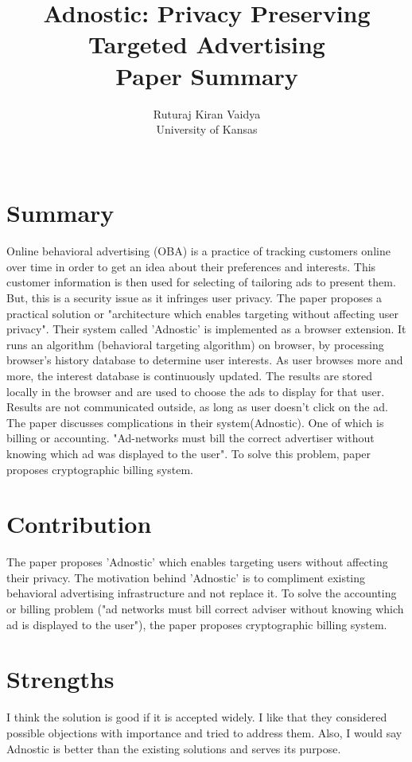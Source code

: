 \documentclass{article}
\title{Adnostic: Privacy Preserving Targeted Advertising \large \\Paper Summary}
\author{Ruturaj Kiran Vaidya\\
  \small University of Kansas\\\\
}
\date{\vspace{-5ex}}
\begin{document}
\maketitle

\section{Summary}
Online behavioral advertising (OBA) is a practice of tracking customers online over time in order to get an idea about their preferences and interests. This customer information is then used for selecting of tailoring ads to present them. But, this is a security issue as it infringes user privacy. The paper proposes a practical solution or "architecture which enables targeting without affecting user privacy"\cite{Cd94}. Their system called 'Adnostic' is implemented as a browser extension. It runs an algorithm (behavioral targeting algorithm) on browser, by processing browser's history database to determine user interests. As user browses more and more, the interest database is continuously updated. The results are stored locally in the browser and are used to choose the ads to display for that user. Results are not communicated outside, as long as user doesn't click on the ad. The paper discusses complications in their system(Adnostic). One of which is billing or accounting. "Ad-networks must bill the correct advertiser without knowing which ad was displayed to the user"\cite{Cd94}. To solve this problem, paper proposes cryptographic billing system.

\section{Contribution}
The paper proposes 'Adnostic' which enables targeting users without affecting their privacy. The motivation behind 'Adnostic' is to compliment existing behavioral advertising infrastructure and not replace it. To solve the accounting or billing problem ("ad networks must bill correct adviser without knowing which ad is displayed to the user"\cite{Cd94}), the paper proposes cryptographic billing system.

\section{Strengths}
I think the solution is good if it is accepted widely. I like that they considered possible objections with importance and tried to address them. Also, I would say Adnostic is better than the existing solutions and serves its purpose.
\end{document}
